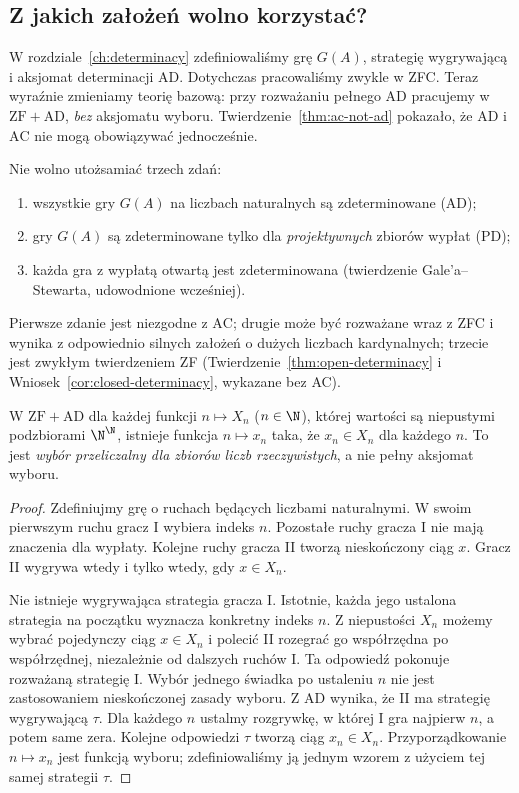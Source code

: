 \subsection{Z jakich założeń wolno korzystać?}
W rozdziale~\ref{ch:determinacy} zdefiniowaliśmy grę $G(A)$,
strategię wygrywającą i aksjomat determinacji $\mathrm{AD}$.
Dotychczas pracowaliśmy zwykle w ZFC. Teraz wyraźnie zmieniamy
teorię bazową: przy rozważaniu pełnego $\mathrm{AD}$ pracujemy
w $\mathrm{ZF}+\mathrm{AD}$, \emph{bez} aksjomatu wyboru.
Twierdzenie~\ref{thm:ac-not-ad} pokazało, że $\mathrm{AD}$ i
$\mathrm{AC}$ nie mogą obowiązywać jednocześnie.

Nie wolno utożsamiać trzech zdań:
\begin{enumerate}
\item wszystkie gry $G(A)$ na liczbach naturalnych są zdeterminowane ($\mathrm{AD}$);
\item gry $G(A)$ są zdeterminowane tylko dla \emph{projektywnych} zbiorów wypłat ($\mathrm{PD}$);
\item każda gra z wypłatą otwartą jest zdeterminowana
      (twierdzenie Gale'a--Stewarta, udowodnione wcześniej).
\end{enumerate}
Pierwsze zdanie jest niezgodne z $\mathrm{AC}$; drugie może być
rozważane wraz z ZFC i wynika z odpowiednio silnych założeń
o dużych liczbach kardynalnych; trzecie jest zwykłym twierdzeniem ZF
(Twierdzenie~\ref{thm:open-determinacy}
i Wniosek~\ref{cor:closed-determinacy},
wykazane bez AC).

\begin{lemat}
\label{lem:ad-countable-choice-reals}
W $\mathrm{ZF}+\mathrm{AD}$ dla każdej funkcji
$n\mapsto X_n$ ($n\in\N$), której wartości są
niepustymi podzbiorami $\N^\N$, istnieje funkcja
$n\mapsto x_n$ taka, że $x_n\in X_n$ dla każdego $n$.
To jest \emph{wybór przeliczalny dla zbiorów liczb rzeczywistych},
a nie pełny aksjomat wyboru.
\end{lemat}
\begin{proof}
Zdefiniujmy grę o ruchach będących liczbami naturalnymi.
W swoim pierwszym ruchu gracz I wybiera indeks $n$.
Pozostałe ruchy gracza I nie mają znaczenia dla wypłaty.
Kolejne ruchy gracza II tworzą nieskończony ciąg $x$.
Gracz II wygrywa wtedy i tylko wtedy, gdy $x\in X_n$.

Nie istnieje wygrywająca strategia gracza I.
Istotnie, każda jego ustalona strategia na początku
wyznacza konkretny indeks $n$. Z niepustości $X_n$
możemy wybrać pojedynczy ciąg $x\in X_n$ i polecić
II rozegrać go współrzędna po współrzędnej, niezależnie
od dalszych ruchów I. Ta odpowiedź pokonuje rozważaną
strategię I. Wybór jednego świadka po ustaleniu $n$
nie jest zastosowaniem nieskończonej zasady wyboru.
Z AD wynika, że II ma strategię wygrywającą $\tau$.
Dla każdego $n$ ustalmy rozgrywkę, w której I gra
najpierw $n$, a potem same zera. Kolejne odpowiedzi
$\tau$ tworzą ciąg $x_n\in X_n$. Przyporządkowanie
$n\mapsto x_n$ jest funkcją wyboru; zdefiniowaliśmy
ją jednym wzorem z użyciem tej samej strategii $\tau$.
\end{proof}

